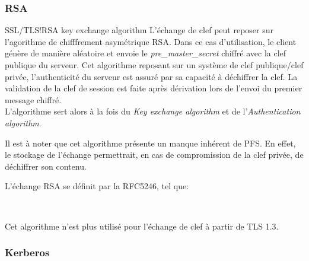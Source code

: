 \documentclass[twoside,a4paper,12pt,titlepage]{book}
\begin{document}
\subsubsection{RSA}
\begin{Define}{SSL/TLS!RSA key exchange algorithm}
L'échange de clef peut reposer sur l'agorithme de chifffrement asymétrique RSA. Dans ce cas d'utilisation, le client génère de manière aléatoire et envoie le \textit{pre\_master\_secret} chiffré avec la clef publique du serveur. Cet algorithme reposant sur un système de clef publique/clef privée, l'authenticité du serveur est assuré par sa capacité à déchiffrer la clef. La validation de la clef de session est faite après dérivation lors de l'envoi du premier message chiffré.\\
L'algorithme sert alors à la fois du \textit{Key exchange algorithm} et de l'\textit{Authentication algorithm}.
\end{Define}
\begin{Warning}
Il est à noter que cet algorithme présente un manque inhérent de \gls{PFS}. En effet, le stockage de l'échange permettrait, en cas de compromission de la clef privée, de déchiffrer son contenu.
\end{Warning}

L'échange RSA se définit par la RFC5246, tel que:\\
 \\

\begin{Stop}
Cet algorithme n'est plus utilisé pour l'échange de clef à partir de TLS 1.3.
\end{Stop}

\subsubsection{Kerberos}
\end{document}
